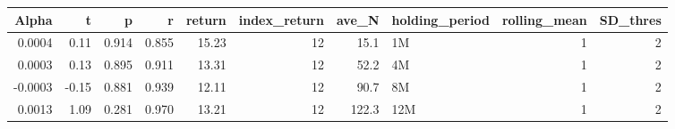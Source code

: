 \begin{table}[ht]
\centering
\begin{tabular}{rrrrrrrlrr}
  \hline
Alpha & t & p & r & return & index\_return & ave\_N & holding\_period & rolling\_mean & SD\_thres \\ 
  \hline
0.0004 & 0.11 & 0.914 & 0.855 & 15.23 & 12 & 15.1 & 1M &  1 &  2 \\ 
  0.0003 & 0.13 & 0.895 & 0.911 & 13.31 & 12 & 52.2 & 4M &  1 &  2 \\ 
  -0.0003 & -0.15 & 0.881 & 0.939 & 12.11 & 12 & 90.7 & 8M &  1 &  2 \\ 
  0.0013 & 1.09 & 0.281 & 0.970 & 13.21 & 12 & 122.3 & 12M &  1 &  2 \\ 
 
   \hline
\end{tabular}
\end{table}

